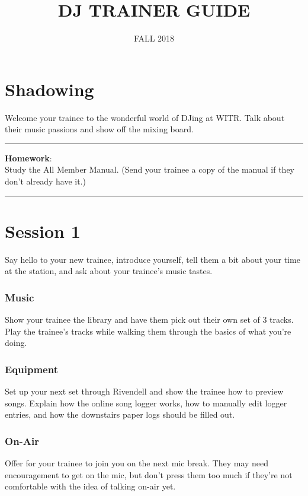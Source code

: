 \documentclass{witrman}
\title{DJ TRAINER GUIDE}
\date{FALL 2018}
\newcommand{\makehomework}[1]{%
\vspace{1mm}
\rule{\textwidth}{1pt}
\textbf{Homework}:\\
#1\\
\rule{\textwidth}{1pt}
}
\begin{document}
\maketitle

\maketoc

\setpagebg

\chapter{Shadowing}

Welcome your trainee to the wonderful world of DJing at WITR. Talk about their
music passions and show off the mixing board.

\makehomework{Study the All Member Manual.  (Send your trainee a copy of the
manual if they don't already have it.)}


\chapter{Session 1}

Say hello to your new trainee, introduce yourself, tell them a bit about your
time at the station, and ask about your trainee's music tastes.

\subsection{Music}

Show your trainee the library and have them pick out their own set of 3 tracks.
Play the trainee's tracks while walking them through the basics of what you're
doing.

\subsection{Equipment}

Set up your next set through Rivendell and show the trainee how to preview
songs.  Explain how the online song logger works, how to manually edit logger
entries, and how the downstairs paper logs should be filled out.

\subsection{On-Air}

Offer for your trainee to join you on the next mic break.  They may need
encouragement to get on the mic, but don't press them too much if they're not
comfortable with the idea of talking on-air yet.
\end{document}
